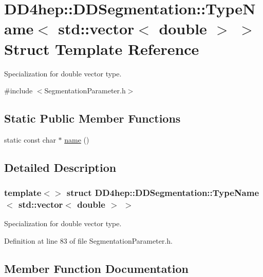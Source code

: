\hypertarget{struct_d_d4hep_1_1_d_d_segmentation_1_1_type_name_3_01std_1_1vector_3_01double_01_4_01_4}{}\section{D\+D4hep\+:\+:D\+D\+Segmentation\+:\+:Type\+Name$<$ std\+:\+:vector$<$ double $>$ $>$ Struct Template Reference}
\label{struct_d_d4hep_1_1_d_d_segmentation_1_1_type_name_3_01std_1_1vector_3_01double_01_4_01_4}


Specialization for double vector type.  




{\ttfamily \#include $<$Segmentation\+Parameter.\+h$>$}

\subsection*{Static Public Member Functions}
\begin{DoxyCompactItemize}
\item 
static const char $\ast$ \hyperlink{struct_d_d4hep_1_1_d_d_segmentation_1_1_type_name_3_01std_1_1vector_3_01double_01_4_01_4_aaa73077623b1de1a73e9e69c44a7131a}{name} ()
\end{DoxyCompactItemize}


\subsection{Detailed Description}
\subsubsection*{template$<$$>$\newline
struct D\+D4hep\+::\+D\+D\+Segmentation\+::\+Type\+Name$<$ std\+::vector$<$ double $>$ $>$}

Specialization for double vector type. 

Definition at line 83 of file Segmentation\+Parameter.\+h.



\subsection{Member Function Documentation}
\hypertarget{struct_d_d4hep_1_1_d_d_segmentation_1_1_type_name_3_01std_1_1vector_3_01double_01_4_01_4_aaa73077623b1de1a73e9e69c44a7131a}{}\label{struct_d_d4hep_1_1_d_d_segmentation_1_1_type_name_3_01std_1_1vector_3_01double_01_4_01_4_aaa73077623b1de1a73e9e69c44a7131a} 

